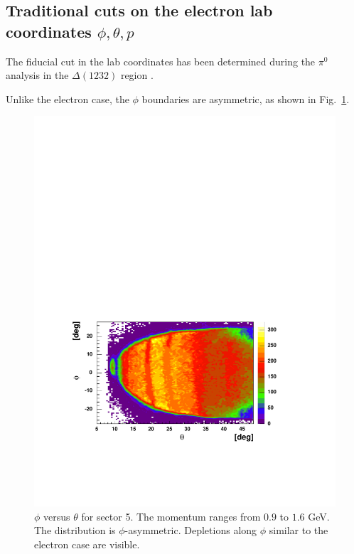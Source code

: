 \subsection{Traditional cuts on the electron lab coordinates $\phi, \theta, p$}
The fiducial cut in the lab coordinates has been determined during the $\pi^0$ analysis in
the $\Delta(1232)$ region \cite{bib:pi0_Delta}.

Unlike the electron case, the $\phi$ boundaries are asymmetric, as shown in
Fig.~\ref{fig:proton_tph}.
\begin{figure}[h]
 \begin{center}
 \includegraphics[width = 13cm, bb=40 120 520 420]{img/proton_tph}
  \caption[$\phi$ versus $\theta$ for sector 5 protons]
           { $\phi$ versus $\theta$ for sector 5. The momentum ranges from $0.9$
	              to $1.6$ GeV. The distribution is $\phi$-asymmetric.
                      Depletions along $\phi$ similar to the electron case are visible. }
 \label{fig:proton_tph}
 \end{center}
\end{figure}

